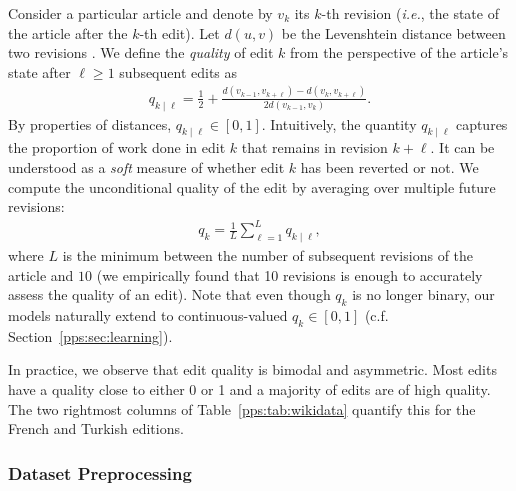 Consider a particular article and denote by $v_k$ its $k$-th revision (\textit{i.e.}, the state of the article after the $k$-th edit).
Let $d(u, v)$ be the Levenshtein distance between two revisions \citep{kruskal1983overview}.
We define the \emph{quality} of edit $k$ from the perspective of the article's state after $\ell \ge 1$ subsequent edits as
\begin{align*}
	q_{k \mid \ell} = \frac{1}{2} + \frac{d(v_{k-1}, v_{k + \ell}) - d(v_k, v_{k + \ell})}{2 d(v_{k-1}, v_k)}.
\end{align*}
By properties of distances, $q_{k \mid \ell} \in [0, 1]$.
Intuitively, the quantity $q_{k \mid \ell}$ captures the proportion of work done in edit $k$ that remains in revision $k + \ell$.
It can be understood as a \emph{soft} measure of whether edit $k$ has been reverted or not.
We compute the unconditional quality of the edit by averaging over multiple future revisions:
\begin{align}
	\label{pps:eq:wikiqual}
	q_k = \frac{1}{L} \sum_{\ell = 1}^L q_{k \mid \ell},
\end{align}
where $L$ is the minimum between the number of subsequent revisions of the article and $10$ (we empirically found that \num{10} revisions is enough to accurately assess the quality of an edit).
Note that even though $q_k$ is no longer binary, our models naturally extend to continuous-valued $q_k \in [0,1]$ (c.f. Section~\ref{pps:sec:learning}).

In practice, we observe that edit quality is bimodal and asymmetric.
Most edits have a quality close to either \num{0} or \num{1} and a majority of edits are of high quality.
The two rightmost columns of Table~\ref{pps:tab:wikidata} quantify this for the French and Turkish editions.

\subsubsection{Dataset Preprocessing}

